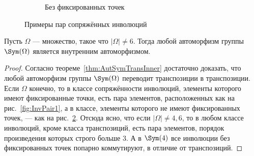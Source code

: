 \documentclass[
	extrafontsizes,
	11pt,
	hyphens,
]{memoir}
\begin{document}
\begin{figure}[h]
\begin{subfigure}[b]{0.4\textwidth}
	\newsavebox{\mytikztwo}
	\usebox{\mytikztwo}
    \caption{Без фиксированных точек}
    \label{fig:InvPair2}
  \end{subfigure}
  \caption{Примеры пар сопряжённых инволюций}
\end{figure}

\begin{theorem}
Пусть \(\Omega\) --- множество, такое что \(\lvert \Omega \rvert \neq 6\). Тогда любой автоморфизм группы \(\Sym(\Omega)\) является внутренним автоморфизмом.
\end{theorem}

\begin{proof}
Согласно теореме~\ref{thm:AutSymTransInner} достаточно доказать, что любой автоморфизм группы \(\Sym(\Omega)\) переводит транспозиции в транспозиции.
Если \(\Omega\) конечно, то в классе сопряжённости инволюций, элементы которого имеют фиксированные точки, есть пара элементов, расположенных как на рис.~\ref{fig:InvPair1}, а в классе, элементы которого не имеют фиксированных точек, --- как на рис.~\ref{fig:InvPair2}.
Отсюда ясно, что если \(\lvert \Omega \rvert \neq 4, 6\), то в любом классе инволюций, кроме класса транспозиций, есть пара элементов, порядок произведения которых строго больше \(3\).
А в \(\Sym(4)\) все инволюции без фиксированных точек попарно коммутируют, в отличие от транспозиций.
\end{proof}

\end{document}
